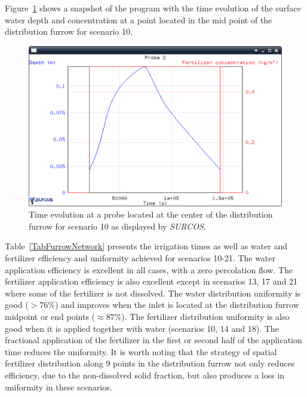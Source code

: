 \documentclass[review,authoryear]{elsarticle}
\begin{document}
Figure~\ref{evoSonda} shows a snapshot of the program with the time evolution of
the surface water depth and concentration at a point located in the mid point of
the distribution furrow for scenario 10. 
\begin{figure}[ht!]
\begin{center}
\includegraphics[width=\textwidth]{evoSondaEN.eps}
\caption{Time evolution at a probe located at the center of the distribution
furrow for scenario 10 as displayed by \emph{SURCOS}.}\label{evoSonda}
\end{center}
\end{figure}

Table~\ref{TabFurrowNetwork} presents the irrigation times as well as water and
fertilizer efficiency and uniformity achieved for scenarios 10-21.  The water application efficiency is excellent in all cases, with a
zero percolation flow. The fertilizer application efficiency is also excellent
except in scenarios 13, 17 and 21 where some of the fertilizer is not dissolved. 
The water distribution uniformity is good ($>76\%$) and improves when the inlet
is located at the distribution furrow midpoint or end points ($\approx 87\%$).
The fertilizer distribution uniformity is also good when it is applied together
with water (scenarios 10, 14 and 18). The fractional application of the fertilizer in
the first or second half of the application time reduces the uniformity. It is
worth noting that the strategy of spatial fertilizer distribution along 9 points
in the distribution furrow not only reduces efficiency, due to the non-dissolved
solid fraction, but also produces a loss in uniformity in these scenarios.
\end{document}
